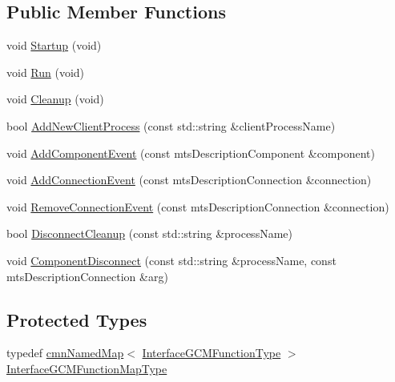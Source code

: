 \subsection*{Public Member Functions}
\begin{DoxyCompactItemize}
\item 
void \hyperlink{classmts_manager_component_server_ab4a7ff516bbe04b439039a2342e48455}{Startup} (void)
\item 
void \hyperlink{classmts_manager_component_server_a18c682506c92fd6e0523e3925f1e637b}{Run} (void)
\item 
void \hyperlink{classmts_manager_component_server_a3cd58f066e7023e2bc000232b178ee55}{Cleanup} (void)
\item 
bool \hyperlink{classmts_manager_component_server_a89c2c3df2989610b4ae2fecb70d3184f}{Add\+New\+Client\+Process} (const std\+::string \&client\+Process\+Name)
\item 
void \hyperlink{classmts_manager_component_server_a51717169473ba879ea40f671dd5f5d27}{Add\+Component\+Event} (const mts\+Description\+Component \&component)
\item 
void \hyperlink{classmts_manager_component_server_a8db723af6b218fa2a0c648664d06da1f}{Add\+Connection\+Event} (const mts\+Description\+Connection \&connection)
\item 
void \hyperlink{classmts_manager_component_server_a77c2a4abdf23b89b842615fa50c0cf3c}{Remove\+Connection\+Event} (const mts\+Description\+Connection \&connection)
\item 
bool \hyperlink{classmts_manager_component_server_a033499e692bea2a893927d637841c1c4}{Disconnect\+Cleanup} (const std\+::string \&process\+Name)
\item 
void \hyperlink{classmts_manager_component_server_a1dcd5082d9a306e6a47b1b22aec218f3}{Component\+Disconnect} (const std\+::string \&process\+Name, const mts\+Description\+Connection \&arg)
\end{DoxyCompactItemize}
\subsection*{Protected Types}
\begin{DoxyCompactItemize}
\item 
typedef \hyperlink{classcmn_named_map}{cmn\+Named\+Map}$<$ \hyperlink{structmts_manager_component_server_1_1_interface_g_c_m_function_type}{Interface\+G\+C\+M\+Function\+Type} $>$ \hyperlink{classmts_manager_component_server_a9b456473c566d9993274d3de0f124f7c}{Interface\+G\+C\+M\+Function\+Map\+Type}
\end{DoxyCompactItemize}
